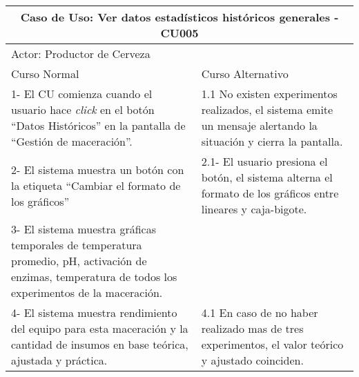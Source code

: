     \begin{table}[H]
    \begin{center}
    \begin{tabularx}{\textwidth}{ | X | X |}
        \hline
        \multicolumn{2}{|c|}{\textbf{Caso de Uso: Ver datos estadísticos históricos generales - CU005}} \\
        \hline
        \multicolumn{2}{|l|}{Actor: Productor de Cerveza} \\
        \hline
        Curso Normal & Curso Alternativo \\
        \hline
        1- El CU comienza cuando el usuario hace \textit{click} en el botón “Datos Históricos” en la pantalla de ``Gestión de maceración''. & 1.1 No existen experimentos realizados, el sistema emite un mensaje alertando la situación y cierra la pantalla.\\
        \hline
        2- El sistema muestra un botón con la etiqueta ``Cambiar el formato de los gráficos''& 2.1- El usuario presiona el botón, el sistema alterna el formato de los gráficos entre lineares y caja-bigote. \\
        \hline
        
        3- El sistema muestra gráficas temporales de temperatura promedio, pH, activación de enzimas, temperatura de todos los experimentos de la maceración. & \\
        \hline
        
        4- El sistema muestra rendimiento del equipo para esta maceración y la cantidad de insumos en base teórica, ajustada y práctica. & 4.1 En caso de no haber realizado mas de tres experimentos, el valor teórico y ajustado coinciden.\\
        \hline
    
    \end{tabularx}
    \label{CU005}
    \end{center}
    \end{table}
    
